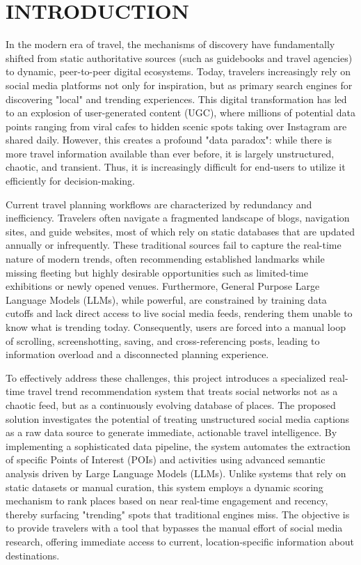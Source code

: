 \documentclass[a4paper,12pt]{report}
\begin{document}
\chapter{INTRODUCTION}
\label{introduction}
In the modern era of travel, the mechanisms of discovery have fundamentally shifted from static authoritative sources (such as guidebooks and travel agencies) to dynamic, peer-to-peer digital ecosystems. Today, travelers increasingly rely on social media platforms not only for inspiration, but as primary search engines for discovering "local" and trending experiences. This digital transformation has led to an explosion of user-generated content (UGC), where millions of potential data points ranging from viral cafes to hidden scenic spots taking over Instagram are shared daily. However, this creates a profound "data paradox": while there is more travel information available than ever before, it is largely unstructured, chaotic, and transient. Thus, it is increasingly difficult for end-users to utilize it efficiently for decision-making.

Current travel planning workflows are characterized by redundancy and inefficiency. Travelers often navigate a fragmented landscape of blogs, navigation sites, and guide websites, most of which rely on static databases that are updated annually or infrequently. These traditional sources fail to capture the real-time nature of modern trends, often recommending established landmarks while missing fleeting but highly desirable opportunities such as limited-time exhibitions or newly opened venues. Furthermore, General Purpose Large Language Models (LLMs), while powerful, are constrained by training data cutoffs and lack direct access to live social media feeds, rendering them unable to know what is trending today. Consequently, users are forced into a manual loop of scrolling, screenshotting, saving, and cross-referencing posts, leading to information overload and a disconnected planning experience.

To effectively address these challenges, this project introduces a specialized real-time travel trend recommendation system that treats social networks not as a chaotic feed, but as a continuously evolving database of places. The proposed solution investigates the potential of treating unstructured social media captions as a raw data source to generate immediate, actionable travel intelligence. By implementing a sophisticated data pipeline, the system automates the extraction of specific Points of Interest (POIs) and activities using advanced semantic analysis driven by Large Language Models (LLMs). Unlike systems that rely on static datasets or manual curation, this system employs a dynamic scoring mechanism to rank places based on near real-time engagement and recency, thereby surfacing "trending" spots that traditional engines miss. The objective is to provide travelers with a tool that bypasses the manual effort of social media research, offering immediate access to current, location-specific information about destinations.
\end{document}
